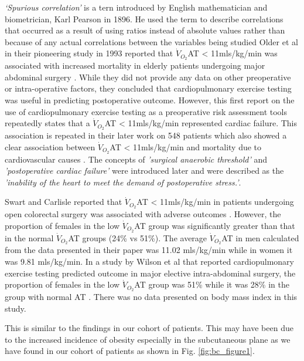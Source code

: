 \textit{`Spurious correlation'} is a tern introduced by English mathematician and biometrician, Karl Pearson in 1896. He used the term to describe correlations that occurred as a result of using ratios instead of absolute values rather than because of any actual correlations between the variables being studied\parencite{pearson_mathematical_1896}
Older et al in their pioneering study in 1993 reported that $\dot{V}_{O_2}$AT < 11mls/kg/min was associated with increased mortality in elderly patients undergoing major abdominal surgery \parencite{older_preoperative_1993}. While they did not provide any data on other preoperative or intra-operative factors, they concluded that cardiopulmonary exercise testing was useful in predicting postoperative outcome. However, this first report on the use of cardiopulmonary exercise testing as a preoperative risk assessment tools repeatedly states that a $\dot{V}_{O_2}$AT < 11mls/kg/min represented cardiac failure. This association is repeated in their later work on 548 patients which also showed a clear association between $\dot{V}_{O_2}$AT < 11mls/kg/min and mortality due to cardiovascular causes \parencite{older_cardiopulmonary_1999}. The concepts of \textit{'surgical anaerobic threshold'} and \textit{'postoperative cardiac failure'} were introduced later and were described as the \textit{'inability of the heart to meet the demand of postoperative stress.'}\parencite{society_ats/accp_2003}.

Swart and Carlisle reported that $\dot{V}_{O_2}$AT < 11mls/kg/min in patients undergoing open colorectal surgery was associated with adverse outcomes \parencite{swart_case-controlled_2012}. However, the proportion of females in the low $\dot{V}_{O_2}$AT group was significantly greater than that in the normal $\dot{V}_{O_2}$AT groups (24\% vs 51\%). The average $\dot{V}_{O_2}$AT in men calculated from the data presented in their paper was 11.02 mls/kg/min while in women it was 9.81 mls/kg/min. In a study by Wilson et al that reported cardiopulmonary exercise testing predicted outcome in major elective intra-abdominal surgery, the proportion of females in the low $\dot{V}_{O_2}$AT group was 51\% while it was 28\% in the group with normal AT \parencite{wilson_impaired_2010}. There was no data presented on body mass index in this study.

This is similar to the findings in our cohort of patients. This may have been due to the increased incidence of obesity especially in the subcutaneous plane as we have found in our cohort of patients as shown in Fig. \ref{fig:bc_figure1}.

